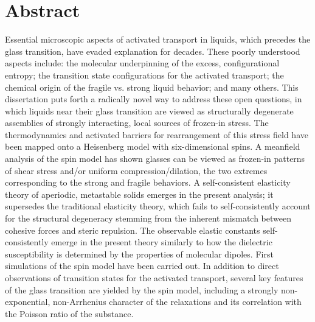 \begingroup
\let\clearpage\relax
\let\cleardoublepage\relax
\let\cleardoublepage\relax
\chapter*{Abstract}
Essential microscopic aspects of activated transport in liquids, which
precedes the glass transition, have evaded explanation for
decades. These poorly understood aspects include: the molecular
underpinning of the excess, configurational entropy; the transition
state configurations for the activated transport; the chemical origin
of the fragile vs. strong liquid behavior; and many others. This
dissertation puts forth a radically novel way to address these open
questions, in which liquids near their glass transition are viewed as
structurally degenerate assemblies of strongly interacting, local
sources of frozen-in stress. The thermodynamics and activated barriers
for rearrangement of this stress field have been mapped onto a
Heisenberg model with six-dimensional spins. A meanfield analysis of
the spin model has shown glasses can be viewed as frozen-in patterns
of shear stress and/or uniform compression/dilation, the two extremes
corresponding to the strong and fragile behaviors. A self-consistent
elasticity theory of aperiodic, metastable solids emerges in the
present analysis; it supersedes the traditional elasticity theory,
which fails to self-consistently account for the structural degeneracy
stemming from the inherent mismatch between cohesive forces and steric
repulsion.  The observable elastic constants self-consistently emerge
in the present theory similarly to how the dielectric susceptibility
is determined by the properties of molecular dipoles. First
simulations of the spin model have been carried out. In addition to
direct observations of transition states for the activated transport,
several key features of the glass transition are yielded by the spin
model, including a strongly non-exponential, non-Arrhenius character
of the relaxations and its correlation with the Poisson ratio of the
substance.
\endgroup			
\vfill
